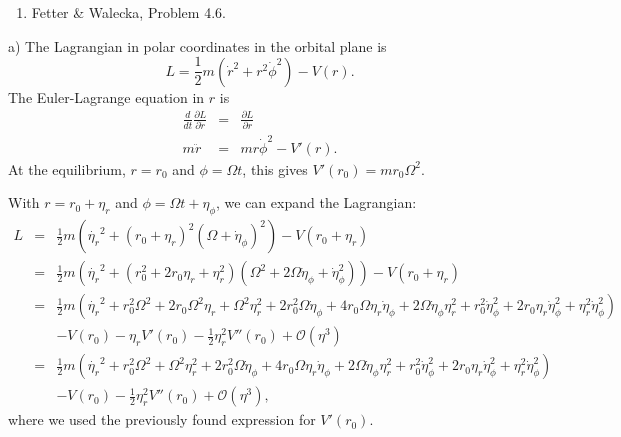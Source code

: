 \documentclass[letterpaper,11pt]{article}
\begin{document}
\begin{enumerate}[resume]
 \item Fetter \& Walecka, Problem 4.6.
\end{enumerate}

a) The Lagrangian in polar coordinates in the orbital plane is
\begin{equation*}
 L = \frac{1}{2} m \left(\dot{r}^2 + r^2\dot{\phi}^2\right) - V(r).
\end{equation*}
The Euler-Lagrange equation in $r$ is
\begin{eqnarray*}
 \frac{d}{dt}\frac{\partial L}{\partial \dot{r}} & = & \frac{\partial L}{\partial r} \\
 m \ddot{r} & = & m r \dot\phi^2 - V'(r).
\end{eqnarray*}
At the equilibrium, $r = r_0$ and $\phi = \Omega t$, this gives $V'(r_0) = m r_0 \Omega^2$.

With $r = r_0 + \eta_r$ and $\phi = \Omega t + \eta_\phi$, we can expand the Lagrangian:
\begin{eqnarray*}
 L & = & \frac{1}{2} m \left(\dot{\eta_r}^2 + (r_0 + \eta_r)^2 (\Omega + \dot\eta_\phi)^2\right) - V(r_0 + \eta_r) \\
   & = & \frac{1}{2} m \left(\dot{\eta_r}^2 + (r_0^2 + 2 r_0 \eta_r + \eta_r^2) (\Omega^2 + 2 \Omega \dot\eta_\phi + \dot\eta_\phi^2)\right) - V(r_0 + \eta_r) \\
   & = & \frac{1}{2} m \left(\dot{\eta_r}^2 + r_0^2 \Omega^2 + 2 r_0 \Omega^2 \eta_r + \Omega^2 \eta_r^2 + 2 r_0^2 \Omega \dot\eta_\phi + 4 r_0 \Omega \eta_r \dot\eta_\phi + 2 \Omega \dot\eta_\phi \eta_r^2 + r_0^2 \dot\eta_\phi^2  + 2 r_0 \eta_r \dot\eta_\phi^2 + \eta_r^2 \dot\eta_\phi^2 \right) \\
   & &  - V(r_0) - \eta_r V'(r_0) - \frac{1}{2} \eta_r^2 V''(r_0) + \mathcal{O}(\eta^3) \\
   & = & \frac{1}{2} m \left(\dot{\eta_r}^2 + r_0^2 \Omega^2 + \Omega^2 \eta_r^2 + 2 r_0^2 \Omega \dot\eta_\phi + 4 r_0 \Omega \eta_r \dot\eta_\phi + 2 \Omega \dot\eta_\phi \eta_r^2 + r_0^2 \dot\eta_\phi^2  + 2 r_0 \eta_r \dot\eta_\phi^2 + \eta_r^2 \dot\eta_\phi^2 \right) \\
   & & - V(r_0) - \frac{1}{2} \eta_r^2 V''(r_0) + \mathcal{O}(\eta^3),
\end{eqnarray*}
where we used the previously found expression for $V'(r_0)$.
\end{document}
